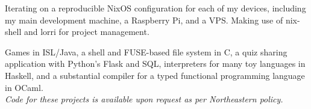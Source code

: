 \documentclass[letterpaper]{cv} %
\begin{document}
\begin{minipage}[t]{0.66\textwidth}
Iterating on a reproducible NixOS configuration for each of my devices,
including my main development machine, a Raspberry Pi, and a VPS.\@
Making use of nix-shell and lorri for project management.
\sectionspace

Games in ISL/Java,
a shell and FUSE-based file system in C,
a quiz sharing application with Python's Flask and SQL,
interpreters for many toy languages in Haskell,
and a substantial compiler for a typed functional programming language in OCaml. \\
\textit{Code for these projects is available upon request as per Northeastern policy.}

\end{minipage} %
\end{document}
